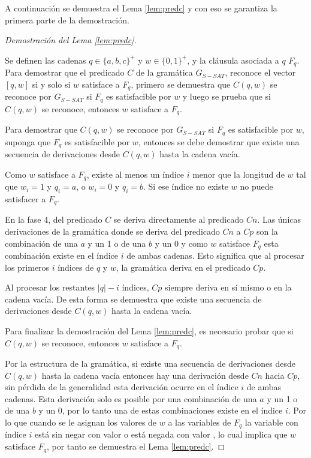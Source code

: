 A continuación se demuestra el Lema \ref{lem:predc} y con eso se garantiza la primera parte de la demostración.

\begin{proof}[Demostración del Lema \ref{lem:predc}] \
    
    Se definen las cadenas $q\in \{a,b,c\}^+$ y $w\in \{0,1\}^+$, y la cláusula asociada a $q$ $F_q$.  Para demostrar que el predicado $C$ de la gramática $G_{S-SAT}$, reconoce el vector $[q,w]$ si y solo si $w$ satisface a $F_q$, primero se demuestra que $C(q,w)$ se reconoce por $G_{S-SAT}$ si $F_q$ es satisfacible por $w$ y luego se prueba que si $C(q,w)$ se reconoce, entonces $w$ satisface a $F_q$.
    
    Para demostrar que $C(q,w)$ se reconoce por $G_{S-SAT}$ si $F_q$ es satisfacible por $w$, suponga que $F_q$ es satisfacible por $w$, entonces se debe demostrar que existe una secuencia de derivaciones desde $C(q,w)$ hasta la cadena vacía.
    
    Como $w$ satisface a $F_q$, existe al menos un índice $i$ menor que la longitud de $w$ tal que $w_i=1$ y $q_i = a$, o $w_i=0$ y $q_i=b$. Si ese índice no existe $w$ no puede satisfacer a $F_q$.
    
    En la fase 4, del predicado $C$ se deriva directamente al predicado $Cn$. Las únicas derivaciones de la gramática donde se deriva del predicado $Cn$ a $Cp$ son la combinación de una $a$ y un 1 o de una $b$ y un 0 y como $w$ satisface $F_q$ esta combinación existe en el índice $i$ de ambas cadenas. Esto significa que al procesar los primeros $i$ índices de $q$ y $w$, la gramática deriva en el predicado $Cp$. 
    
    Al procesar los restantes $|q|-i$ índices, $Cp$ siempre deriva en sí mismo o en la cadena vacía. De esta forma se demuestra que existe una secuencia de derivaciones desde $C(q,w)$ hasta la cadena vacía.
    
    Para finalizar la demostración del Lema \ref{lem:predc}, es necesario probar que si $C(q,w)$ se reconoce, entonces $w$ satisface a $F_q$. 
    
    Por la estructura de la gramática, si existe una secuencia de derivaciones desde $C(q,w)$ hasta la cadena vacía entonces hay una derivación desde $Cn$ hacia $Cp$, sin pérdida de la generalidad esta derivación ocurre en el índice $i$ de ambas cadenas. Esta derivación solo es posible por una combinación de una $a$ y un 1 o de una $b$ y un 0, por lo tanto una de estas combinaciones existe en el índice $i$. Por lo que cuando se le asignan los valores de $w$ a las variables de $F_q$ la variable con índice $i$ está
    sin negar con valor \true{} o está negada con valor \false{}, lo cual implica que $w$ satisface $F_q$, por tanto se demuestra el Lema \ref{lem:predc}.
\end{proof}


